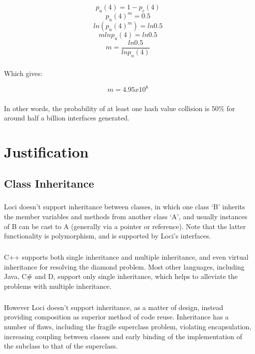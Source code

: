 \documentclass[12pt,twoside,notitlepage]{report}
\begin{document}
$$p_{u}(4) = 1 - p_{c}(4)$$
$$p_{u}(4)^m = 0.5$$
$$ln (p_{u}(4)^m) = ln 0.5$$
$$m ln p_{u}(4) = ln 0.5$$
$$m = \frac{ln 0.5}{ln p_{u}(4)}$$

\paragraph{}
Which gives:

$$m = 4.95 x 10^8$$

\paragraph{}
In other words, the probability of at least one hash value collision is 50\% for around half a billion interfaces generated.

\cleardoublepage

\chapter{Justification}

\section{Class Inheritance}

\paragraph{}
Loci doesn't support inheritance between classes, in which one class `B' inherits the member variables and methods from another class `A', and usually instances of B can be cast to A (generally via a pointer or reference). Note that the latter functionality is polymorphism, and is supported by Loci's interfaces.

\paragraph{}
C++ supports both single inheritance and multiple inheritance, and even virtual inheritance for resolving the diamond problem. Most other languages, including Java, C\# and D, support only single inheritance, which helps to alleviate the problems with multiple inheritance.

\paragraph{}
However Loci doesn't support inheritance, as a matter of design, instead providing composition as superior method of code reuse. Inheritance has a number of flaws, including the fragile superclass problem, violating encapsulation, increasing coupling between classes and early binding of the implementation of the subclass to that of the superclass.
\end{document}
